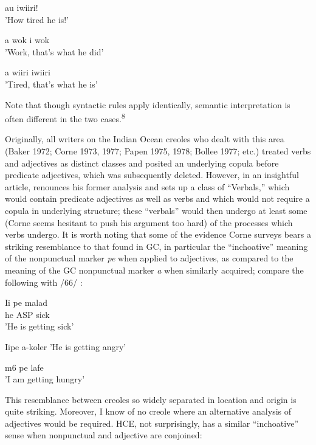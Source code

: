 \ea\label{ex:68}
{au} {i}{wiiri!}\\
\glt'How tired he is!'
\z



\ea\label{ex:69}
 {a} {wok} {i} {wok}\\
\glt'Work, that's what he did'
\z



\ea\label{ex:70}
{a} {wiiri} {i}{wiiri}\\
\glt'Tired, that's what he is' 
\z




Note that though syntactic rules apply identically, semantic interpre\-tation is often different in the two cases.\textsuperscript{8}

Originally, all writers on the Indian Ocean creoles who dealt with this area (Baker 1972; Corne 1973, 1977; Papen 1975, 1978; Bollee 1977; etc.) treated verbs and adjectives as distinct classes and posited an underlying copula before predicate adjectives, which was subsequently deleted. However, in an insightful article, \citet{Corne1981} renounces his former analysis and sets up a class of ``Verbals,'' which would contain predicate adjectives as well as verbs and which would not require a copula in underlying structure; these ``verbals'' would then undergo at least some (Corne seems hesitant to push his argument too hard) of the processes which verbs undergo. It is worth noting that some of the evidence Corne surveys bears a striking resemblance to that found in GC, in particular the ``inchoative'' meaning of the nonpunctual marker \textit{pe} when applied to adjectives, as compared to the meaning of the GC nonpunctual marker \textit{a} when similarly acquired; compare the following with /66/ :

\ea\label{ex:71}
 \gll Ii pe malad\\
he ASP sick\\
\glt'He is getting sick'
\z





\ea\label{ex:72}
 Iipe a-koler
\glt 'He is getting angry'
\z

\ea\label{ex:73}
 m6 pe lafe\\
\glt 'I am getting hungry'
\z

This resemblance between creoles so widely separated in location and origin is quite striking. Moreover, I know of no creole where an alterna\-tive analysis of adjectives would be required. HCE, not surprisingly, has a similar ``inchoative'' sense when nonpunctual and adjective are conjoined:


